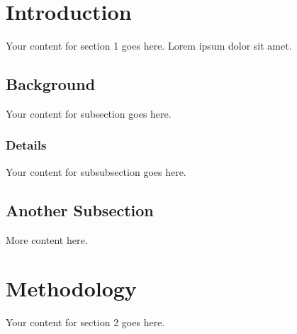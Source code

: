 \documentclass{article}
\begin{document}
\section{Introduction}
Your content for section 1 goes here. Lorem ipsum dolor sit amet.

\subsection{Background}
Your content for subsection goes here.

\subsubsection{Details}
Your content for subsubsection goes here.

\subsection{Another Subsection}
More content here.

\section{Methodology}
Your content for section 2 goes here.
\end{document}
